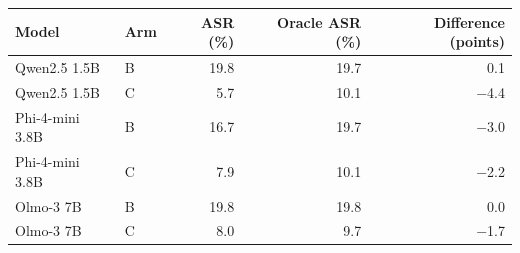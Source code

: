 \begin{tabular}{llrrr}
\toprule
Model & Arm & ASR (\%) & Oracle ASR (\%) & Difference (points) \\
\midrule
Qwen2.5 1.5B & B & 19.8 & 19.7 & 0.1 \\
Qwen2.5 1.5B & C & 5.7 & 10.1 & $-$4.4 \\
Phi-4-mini 3.8B & B & 16.7 & 19.7 & $-$3.0 \\
Phi-4-mini 3.8B & C & 7.9 & 10.1 & $-$2.2 \\
Olmo-3 7B & B & 19.8 & 19.8 & 0.0 \\
Olmo-3 7B & C & 8.0 & 9.7 & $-$1.7 \\
\bottomrule
\end{tabular}
